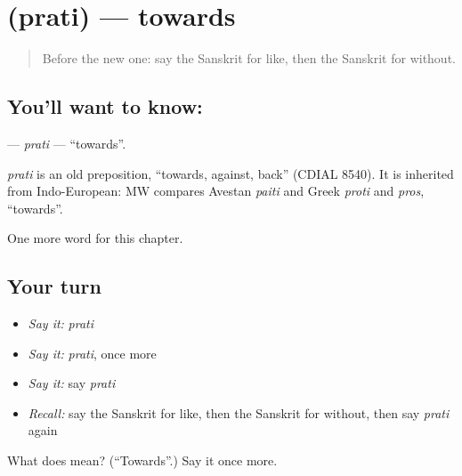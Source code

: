 \section[\texorpdfstring{\sk{प्रति} (prati)}{प्रति (prati)}]{ (prati) — towards}

\label{lesson:SA-C214-prati}



\begin{quote}
Before the new one: say the Sanskrit for like, then the Sanskrit for without.
\end{quote}

\subsection*{You'll want to know: }
\textbf{} — \emph{prati} — \textquotedblleft{}towards\textquotedblright{}.

\begin{cousinweb}
\emph{prati} is an old preposition, \textquotedblleft{}towards, against, back\textquotedblright{} (CDIAL 8540). It is inherited from Indo-European: MW compares Avestan \emph{paiti} and Greek \emph{proti} and \emph{pros}, \textquotedblleft{}towards\textquotedblright{}.
\end{cousinweb}

\begin{grammarlens}[title={What you've built}]
One more word for this chapter.
\end{grammarlens}

\subsection*{Your turn}
\begin{itemize}
\raggedright
  \item \emph{Say it:} \emph{prati}
  \item \emph{Say it:} \emph{prati}, once more
  \item \emph{Say it:} say \emph{prati}
  \item \emph{Recall:} say the Sanskrit for like, then the Sanskrit for without, then say \emph{prati} again
\end{itemize}

\begin{tcolorbox}[breakable,colback=teal!4,colframe=teal!35!black,title={Before you move on}]
What does  mean? (\textquotedblleft{}Towards\textquotedblright{}.) Say it once more.
\end{tcolorbox}
